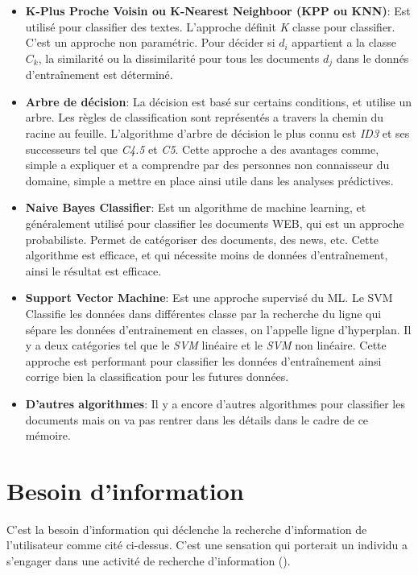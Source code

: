 \begin{itemize}
    \item \textbf{K-Plus Proche Voisin ou K-Nearest Neighboor (KPP ou KNN)}: Est utilisé pour classifier des textes. L'approche définit \textit{K} classe pour classifier. C'est un approche non paramétric. Pour décider si $d_{i}$ appartient a la classe $C_{k}$, la similarité ou la dissimilarité pour tous les documents $d_{j}$ dans le donnés d’entraînement est déterminé.
    \item \textbf{Arbre de décision}: La décision est basé sur certains conditions, et utilise un arbre. Les règles de classification sont représentés a travers la chemin du racine au feuille. L'algorithme d'arbre de décision le plus connu est \textit{ID3} et ses successeurs tel que \textit{C4.5} et \textit{C5}. Cette approche a des avantages comme, simple a expliquer et a comprendre par des personnes non connaisseur du domaine, simple a mettre en place ainsi utile dans les analyses prédictives.
    \item \textbf{Naive Bayes Classifier}: Est un algorithme de machine learning, et généralement utilisé pour classifier les documents WEB, qui est un approche probabiliste. Permet de catégoriser des documents, des news, etc. Cette algorithme est efficace, et qui nécessite moins de données d’entraînement, ainsi le résultat est efficace.
    \item \textbf{Support Vector Machine}: Est une approche supervisé du ML. Le SVM Classifie les données dans différentes classe par la recherche du ligne qui sépare les données d'entrainement en classes, on l'appelle ligne d'hyperplan. Il y a deux catégories tel que le \textit{SVM} linéaire et le \textit{SVM} non linéaire. Cette approche est performant pour classifier les données d’entraînement ainsi corrige bien la classification pour les futures données.
    \item \textbf{D'autres algorithmes}: Il y a encore d'autres algorithmes pour classifier les documents mais on va pas rentrer dans les détails dans le cadre de ce mémoire.
\end{itemize}

\section{Besoin d'information}
\label{sec:besoin-information}
\begin{definition}
    C'est la besoin d'information qui déclenche la recherche d'information de l'utilisateur comme cité ci-dessus. C'est une sensation qui porterait un individu a s'engager dans une activité de recherche d'information (\cite{thesaurus-ir-web}).
\end{definition}

